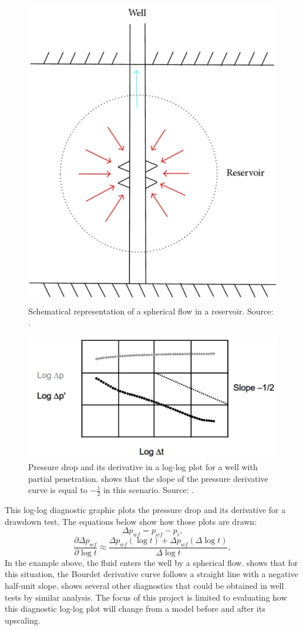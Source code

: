 \begin{figure}[H]
	\centering
	\includegraphics[width=0.5\linewidth]{Images/34}
	\caption{Schematical representation of a spherical flow in a reservoir. Source: \cite{Bourdet2002}.}
	\label{fig:34}
\end{figure}
\begin{figure}[H]
	\centering
	\includegraphics[width=0.9\linewidth]{Images/33}
	\caption{Pressure drop and its derivative in a log-log plot for a well with partial penetration. \cite{Bourdet2002} shows that the slope of the pressure derivative curve is equal to $-\frac{1}{2}$ in this scenario. Source: \cite{Bourdet2002}.}
	\label{fig:33}
\end{figure}
\noindent
This log-log diagnostic graphic plots the pressure drop and its derivative for a drawdown test. The equations below show how those plots are drawn:
\begin{equation}
	\label{pressure_drop}
	\Delta p_{wf} = p_{wf} - p_i,
\end{equation}
\begin{equation}
\label{pressure_drop_derivative}
\frac{\partial \Delta p_{wf}}{\partial \log t} \approx \frac{\Delta p_{wf}(\log t) + \Delta p_{wf}(\Delta \log t)}{\Delta \log t},
\end{equation}
In the example above, the fluid enters the well by a spherical flow. \cite{Bourdet2002} shows that for this situation, the Bourdet derivative curve follows a straight line with a negative half-unit slope. \cite{Bourdet2002} shows several other diagnostics that could be obtained in well tests by similar analysis. The focus of this project is limited to evaluating how this diagnostic log-log plot will change from a model before and after its upscaling.

